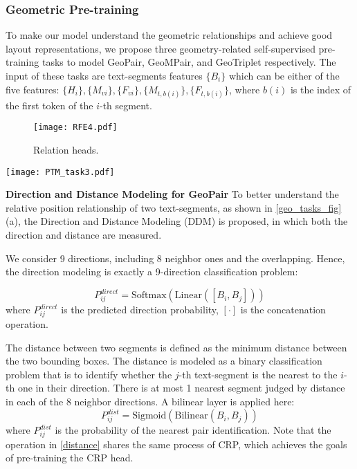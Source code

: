 \documentclass[10pt,twocolumn,letterpaper]{article}
\begin{document}
\subsubsection{Geometric Pre-training}
\label{sec:geo_tasks}


To make our model understand the geometric relationships and achieve good layout representations, we propose three geometry-related self-supervised pre-training tasks to model GeoPair, GeoMPair, and GeoTriplet respectively.
The input of these tasks are text-segments features $\{B_i\}$ which can be either of the five features: $\{H_{i}\},\{M_{vi}\},\{F_{vi}\},\{M_{t,b(i)}\},\{F_{t,b(i)}\}$, where $b(i)$ is the index of the first token of the $i$-th segment.


\begin{figure}[tp]
  \centering
\texttt{[image: RFE4.pdf]}
  \caption{Relation heads.}
  \label{task_head_fig}
  \vspace{-3mm}
\end{figure}

\begin{figure*}[tp]
  \centering
  \texttt{[image: PTM\_task3.pdf]}
\vspace{-3mm}
  \caption{Geometric pre-training.}
  \label{geo_tasks_fig}
  \vspace{-6mm}
\end{figure*}



\noindent\textbf{Direction and Distance Modeling for GeoPair} To better understand the relative position relationship of two text-segments, as shown in \cref{geo_tasks_fig}(a), the Direction and Distance Modeling (DDM) is proposed, in which both the direction and distance are measured.





We consider 9 directions, including 8 neighbor ones\cite{luo2020merge} and the overlapping.
Hence, the direction modeling is exactly a 9-direction classification problem:

\begin{equation}
  P_{ij}^{direct} = \mathrm{Softmax}(\mathrm{Linear}([B_i, B_j]))
  \label{dierecion}
\end{equation}
where $P_{ij}^{direct}$ is the predicted direction probability, $[\cdot]$ is the concatenation operation.

The distance between two segments is defined as the minimum distance between the two bounding boxes\cite{luo2020merge}.
The distance is modeled as a binary classification problem that is to identify whether the $j$-th text-segment is the nearest to the $i$-th one in their direction. There is at most 1 nearest segment judged by distance in each of the 8 neighbor directions.
A bilinear layer is applied here:
\begin{equation}
  P_{ij}^{dist} = \mathrm{Sigmoid}(\mathrm{Bilinear}(B_i, B_j))
  \label{distance}
\end{equation}
where $P_{ij}^{dist}$ is the probability of the nearest pair identification.
Note that the operation in \cref{distance} shares the same process of CRP, which achieves the goals of pre-training the CRP head.
\end{document}
